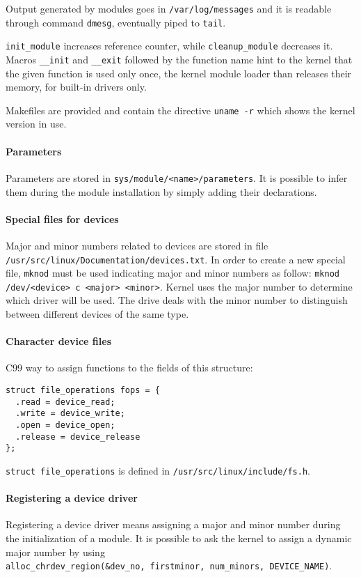 Output generated by modules goes in \texttt{/var/log/messages} and it is readable through command \texttt{dmesg}, eventually piped to \texttt{tail}.

\texttt{init\_module} increases reference counter, while \texttt{cleanup\_module} decreases it. Macros \texttt{\_\_init} and \texttt{\_\_exit} followed by the function name hint to the kernel that the given function is used only once, the kernel module loader than releases their memory, for built-in drivers only.

Makefiles are provided and contain the directive \texttt{uname -r} which shows the kernel version in use.

\paragraph{Parameters}
Parameters are stored in \texttt{sys/module/<name>/parameters}. It is possible to infer them during the module installation by simply adding their declarations.

\paragraph{Special files for devices} Major and minor numbers related to devices are stored in file
\texttt{/usr/src/linux/Documentation/devices.txt}. In order to create a new special file, \texttt{mknod} must be used indicating major and minor numbers as follow: \texttt{mknod /dev/<device> c <major> <minor>}. Kernel uses the major number to determine which driver will be used. The drive deals with the minor number to distinguish between different devices of the same type.

\paragraph{Character device files}
C99 way to assign functions to the fields of this structure:
\begin{verbatim}
struct file_operations fops = {
  .read = device_read;
  .write = device_write;
  .open = device_open;
  .release = device_release
};
\end{verbatim}
\texttt{struct file\_operations} is defined in \texttt{/usr/src/linux/include/fs.h}.

\paragraph{Registering a device driver}
Registering a device driver means assigning a major and minor number during the initialization of a module. It is possible to ask the kernel to assign a dynamic major number by using \\
\texttt{alloc\_chrdev\_region(\&dev\_no, firstminor, num\_minors, DEVICE\_NAME)}.

